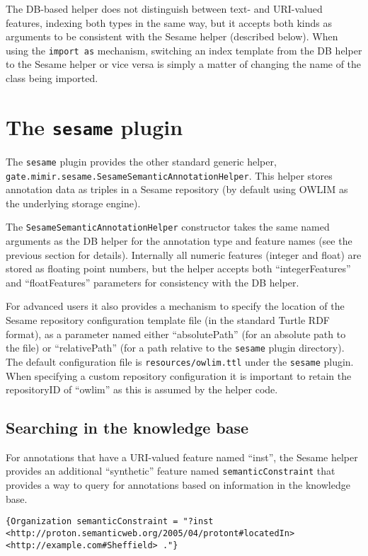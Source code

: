 The DB-based helper does not distinguish between text- and URI-valued features,
indexing both types in the same way, but it accepts both kinds as arguments
to be consistent with the Sesame helper (described below).  When using the
{\tt import as} mechanism, switching an index template from the DB helper to
the Sesame helper or vice versa is simply a matter of changing the name of the
class being imported.

\section{The {\tt sesame} plugin}\label{sec:plugins:sesame}

The {\tt sesame} plugin provides the other standard generic helper,
\lstinline!gate.mimir.sesame.SesameSemanticAnnotationHelper!.  This helper
stores annotation data as triples in a Sesame repository (by default using
OWLIM as the underlying storage engine).

The \lstinline!SesameSemanticAnnotationHelper! constructor takes the same named
arguments as the DB helper for the annotation type and feature names (see the
previous section for details).  Internally all numeric features (integer and
float) are stored as floating point numbers, but the helper accepts both
``integerFeatures'' and ``floatFeatures'' parameters for consistency with the
DB helper.

For advanced users it also provides a mechanism to specify the location of the
Sesame repository configuration template file (in the standard Turtle RDF
format), as a parameter named either ``absolutePath'' (for an absolute path
to the file) or ``relativePath'' (for a path relative to the {\tt sesame}
plugin directory).  The default configuration file is {\tt resources/owlim.ttl}
under the {\tt sesame} plugin.  When specifying a custom repository
configuration it is important to retain the repositoryID of ``owlim'' as this
is assumed by the helper code.

\subsection{Searching in the knowledge base}

For annotations that have a URI-valued feature named ``inst'', the Sesame
helper provides an additional ``synthetic'' feature named
{\tt semanticConstraint} that provides a way to query for annotations based on
information in the knowledge base.
\begin{lstlisting}[breaklines]
{Organization semanticConstraint = "?inst <http://proton.semanticweb.org/2005/04/protont#locatedIn> <http://example.com#Sheffield> ."}
\end{lstlisting}

